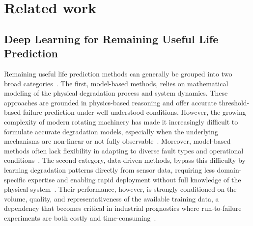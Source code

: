 \section{Related work}

\subsection{Deep Learning for Remaining Useful Life Prediction}
\label{sec:dl_rul}

Remaining useful life prediction methods can generally be grouped
into two broad categories~\cite{shang_capsule_2024, bai_towards_2024}.
The first, model-based methods, relies on mathematical modeling of
the physical degradation process and system dynamics. These approaches
are grounded in physics-based reasoning and offer accurate
threshold-based failure prediction under well-understood conditions.
However, the growing complexity of modern rotating machinery has made
it increasingly difficult to formulate accurate degradation models,
especially when the underlying mechanisms are non-linear or not fully
observable~\cite{heimes_recurrent_2008}. Moreover, model-based methods
often lack flexibility in adapting to diverse fault types and
operational conditions~\cite{shang_capsule_2024}. The second category,
data-driven methods, bypass this difficulty by learning
degradation patterns directly from sensor data, requiring less
domain-specific expertise and enabling rapid deployment without full
knowledge of the physical system~\cite{datadriven,
heimes_recurrent_2008}. Their performance, however, is strongly
conditioned on the volume, quality, and representativeness of the
available training data, a dependency that becomes critical in
industrial prognostics where run-to-failure experiments are both costly
and time-consuming~\cite{s25144481, pan2025remaining}.\\

